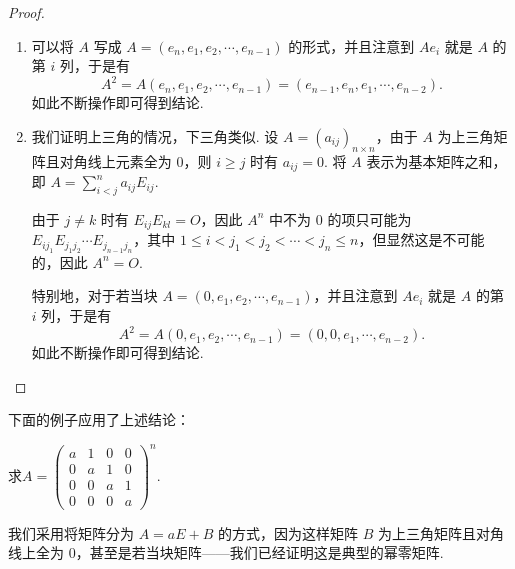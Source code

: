 \begin{enumerate}
          \begin{proof}
            \begin{enumerate}
                \item 可以将 $A$ 写成 $A = (e_n, e_1, e_2, \cdots, e_{n-1})$ 的形式，并且注意到 $Ae_i$ 就是 $A$ 的第 $i$ 列，于是有
                \[A^2 = A(e_n, e_1, e_2, \cdots, e_{n-1}) = (e_{n-1}, e_n, e_1, \cdots, e_{n-2}).\]
                如此不断操作即可得到结论.
                \item 我们证明上三角的情况，下三角类似. 设 $A = (a_{ij})_{n \times n}$，由于 $A$ 为上三角矩阵且对角线上元素全为 $0$，则 $i \geqslant j$ 时有 $a_{ij} = 0$. 将 $A$ 表示为基本矩阵之和，即 $A = \sum\limits_{i < j}^na_{ij}E_{ij}$.

                由于 $j \neq k$ 时有 $E_{ij}E_{kl} = O$，因此 $A^n$ 中不为 $0$ 的项只可能为 $E_{ij_1}E_{j_1j_2}\cdots E_{j_{n-1}j_n}$，其中 $1 \leqslant i < j_1 < j_2 < \cdots < j_n \leqslant n$，但显然这是不可能的，因此 $A^n = O$.

                特别地，对于若当块 $A = (0,e_1,e_2,\cdots,e_{n-1})$，并且注意到 $Ae_i$ 就是 $A$ 的第 $i$ 列，于是有
                \[A^2 = A(0,e_1,e_2,\cdots,e_{n-1}) = (0, 0, e_1, \cdots, e_{n-2}).\]
                如此不断操作即可得到结论.
            \end{enumerate}
          \end{proof}

          下面的例子应用了上述结论：
          \begin{example}{}{}
              求$A=\begin{pmatrix}a & 1 & 0 & 0 \\ 0 & a & 1 & 0 \\ 0 & 0 & a & 1 \\ 0 & 0 & 0 & a \end{pmatrix}^n$.
          \end{example}
          我们采用将矩阵分为 $A = aE + B$ 的方式，因为这样矩阵 $B$ 为上三角矩阵且对角线上全为 0，甚至是若当块矩阵——我们已经证明这是典型的幂零矩阵.


\end{enumerate}
